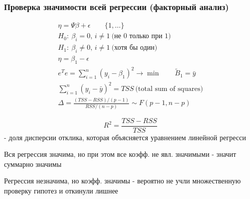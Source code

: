 \documentclass{article}
\begin{document}
\subsubsection{Проверка значимости всей регрессии (факторный анализ)}
\begin{gather*}
  \eta = \Psi \beta + \epsilon \qquad \{1,\dots \} \\ 
  H_0: \: \beta_i = 0, \, i\neq 1 \ \text{(не 0 только при 1)} \\ 
  H_1: \: \beta_i \neq 0, \, i\neq 1 \ \text{(хотя бы один)} \\ 
  \eta = \beta_1 - \epsilon \\ 
  e^{T}e=\sum_{i=1}^{n}(y_i - \beta_1)^{2} \to \min \qquad \tilde{B}_1=\bar{y} \\ 
  \sum_{i=1}^{n}(y_i - \bar{y})^{2} = TSS \ \text{(total sum of squares)} \\ 
  \Delta = \frac{(TSS - RSS)/(p-1)}{RSS/(n-p)} \sim F(p-1, n-p)
\end{gather*}
\begin{definition}
  \[
    R^{2}= \frac{TSS - RSS}{TSS}
  \]
  - доля дисперсии отклика, которая объясняется уравнением линейной регресси
\end{definition}
\begin{remark}
  \phantom{.}

  Вся регрессия значима, но при этом все коэфф. не явл. значимыми - значит суммарно значимы

  Регрессия незначима, но коэфф. значимы - вероятно не учли множественную проверку гипотез и откинули лишнее
\end{remark}
\end{document}

